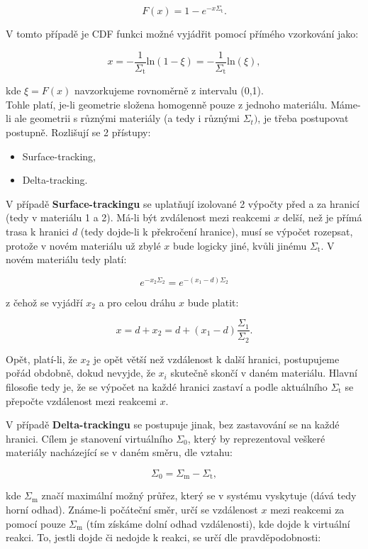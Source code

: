 $$ F(x) = 1 - e^{-x \Sigma_\text{t}}. $$

V tomto případě je CDF funkci možné vyjádřit pomocí přímého vzorkování jako:

$$ x = -\dfrac{1}{\Sigma_{\text{t}}} \text{ln}(1-\xi) = -\dfrac{1}{\Sigma_{\text{t}}} \text{ln}(\xi), $$

kde $\xi = F(x)$ navzorkujeme rovnoměrně z intervalu (0,1). \\

Tohle platí, je-li geometrie složena homogenně pouze z jednoho materiálu. Máme-li ale geometrii s různými materiály (a tedy i různými $\Sigma_{t})$, je třeba postupovat postupně. Rozlišují se 2 přístupy:

\begin{itemize}
  \item Surface-tracking,
  \item Delta-tracking.
\end{itemize}

V případě \textbf{Surface-trackingu} se uplatňují izolované 2 výpočty před a za hranicí (tedy v materiálu 1 a 2). Má-li být zvdálenost mezi reakcemi $x$ delší, než je přímá trasa k hranici $d$ (tedy dojde-li k překročení hranice), musí se výpočet rozepsat, protože v novém materiálu už zbylé $x$ bude logicky jiné, kvůli jinému $\Sigma_\text{t}$. V novém materiálu tedy platí:

$$ e^{-x_2 \Sigma_2} = e^{-(x_1-d)\Sigma_2} $$

z čehož se vyjádří $x_2$ a pro celou dráhu $x$ bude platit:

$$ x = d + x_2 = d + (x_1 - d) \dfrac{\Sigma_1}{\Sigma_2}. $$

Opět, platí-li, že $x_2$ je opět větší než vzdálenost k další hranici, postupujeme pořád obdobně, dokud nevyjde, že $x_i$ skutečně skončí v daném materiálu. Hlavní filosofie tedy je, že se výpočet na každé hranici zastaví a podle aktuálního $\Sigma_\text{t}$ se přepočte vzdálenost mezi reakcemi $x$.

V případě \textbf{Delta-trackingu} se postupuje jinak, bez zastavování se na každé hranici. Cílem je stanovení virtuálního $\Sigma_0$, který by reprezentoval veškeré materiály nacházející se v daném směru, dle vztahu:

$$ \Sigma_0 = \Sigma_\text{m} - \Sigma_\text{t}, $$

kde $\Sigma_\text{m}$ značí maximální možný průřez, který se v systému vyskytuje (dává tedy horní odhad). Známe-li počáteční směr, určí se vzdálenost $x$ mezi reakcemi za pomocí pouze $\Sigma_\text{m}$ (tím získáme dolní odhad vzdálenosti), kde dojde k virtuální reakci. To, jestli dojde či nedojde k reakci, se určí dle pravděpodobnosti:

